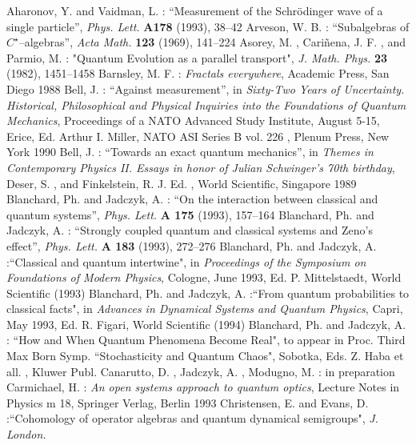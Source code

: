 \documentclass[12pt]{article}
\begin{document}
\begin{thebibliography}{99}
 Aharonov,  Y.  and Vaidman,  L.  : ``Measurement of the Schr\"odinger
wave of a single particle'', {\sl Phys.  Lett.  }{\bf A178} (1993), 38--42
 Arveson,  W.  B.  : ``Subalgebras of $C^{\star}$--algebras'', 
{\sl Acta Math. }{\bf 123} (1969), 141--224
 Asorey,  M. ,  Cari\~nena,  J. F. ,  and Parmio,  M. : 
"Quantum Evolution as a parallel transport",  {\sl J. Math. Phys. }{\bf 23} (1982), 
1451--1458
 Barnsley,  M. F. : {\sl Fractals everywhere},  Academic Press,  San
Diego 1988
 Bell,  J. : ``Against measurement'', in
{\sl Sixty-Two Years of Uncertainty. Historical, Philosophical and
Physical Inquiries into the Foundations of Quantum Mechanics}, Proceedings
of a NATO Advanced Study Institute, August 5-15, Erice, Ed. Arthur I. Miller,
NATO ASI Series B vol. 226 , Plenum Press, New York 1990 
 Bell,  J. : ``Towards an exact quantum mechanics'',  in
{\sl Themes in Contemporary Physics II.  Essays in honor of Julian
Schwinger's 70th birthday},  Deser,  S. ,  and Finkelstein,  R. J.  Ed. , 
World Scientific,  Singapore 1989
 Blanchard,  Ph.  and Jadczyk,  A. : ``On the interaction
between classical and quantum systems'', {\sl Phys. Lett. }{\bf A
175} (1993), 157--164
 Blanchard,  Ph.  and Jadczyk,  A. : ``Strongly coupled
quantum and classical systems and Zeno's effect'', {\sl
Phys. Lett. }{\bf A 183} (1993), 272--276
  Blanchard,  Ph.  and Jadczyk,  A. :``Classical and quantum
intertwine",  in {\sl Proceedings of the Symposium on Foundations of
Modern Physics},  Cologne,  June 1993,  Ed.  P.  Mittelstaedt,  World
Scientific  (1993)
 Blanchard,  Ph.  and Jadczyk,  A. :``From quantum
probabilities to classical facts",  in {\sl Advances in Dynamical
Systems and Quantum Physics},  Capri,  May 1993,  Ed.  R.  Figari,  World
Scientific  (1994) 
 Blanchard,  Ph.  and Jadczyk,  A. : ``How and
When Quantum Phenomena Become Real",  to appear in Proc. 
Third Max Born Symp. ``Stochasticity and Quantum Chaos", 
Sobotka,  Eds.  Z.  Haba et all. ,  Kluwer Publ. 
Canarutto,  D. ,  Jadczyk,  A. ,  Modugno,  M. :  in preparation
 Carmichael,  H. : 
{\sl An open systems approach to quantum optics}, 
Lecture Notes in Physics m 18,  Springer Verlag,  Berlin 1993
 Christensen,  E.  and Evans,  D. :``Cohomology of
operator algebras and quantum dynamical semigroups",  {\sl J.  London. 
}
\end{thebibliography}
\end{document}
